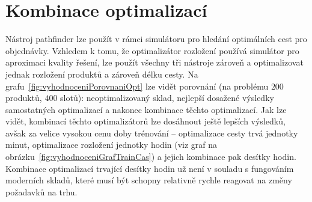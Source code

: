 \section{Kombinace optimalizací}
Nástroj pathfinder lze použít v rámci simulátoru pro hledání optimálních cest pro objednávky. Vzhledem k tomu, že optimalizátor rozložení používá simulátor pro aproximaci kvality řešení, lze použít všechny tři nástroje zároveň a optimalizovat jednak rozložení produktů a zároveň délku cesty. Na grafu~\ref{fig:vyhodnoceniPorovnaniOpt} lze vidět porovnání (na problému $200$ produktů, $400$ slotů): neoptimalizovaný sklad, nejlepší dosažené výsledky samostatných optimalizací a nakonec kombinace těchto optimalizací. Jak lze vidět, kombinací těchto optimalizátorů lze dosáhnout ještě lepších výsledků, avšak za velice vysokou cenu doby trénování -- optimalizace cesty trvá jednotky minut, optimalizace rozložení jednotky hodin (viz graf na obrázku~\ref{fig:vyhodnoceniGrafTrainCas}) a jejich kombinace pak desítky hodin. Kombinace optimalizací trvající desítky hodin už není v souladu s fungováním moderních skladů, které musí být schopny relativně rychle reagovat na změny požadavků na trhu.
